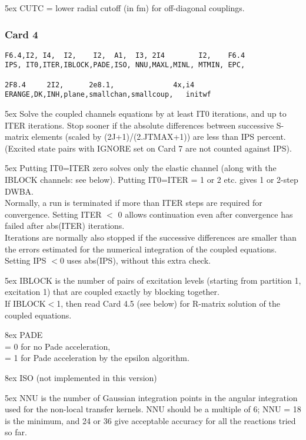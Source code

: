 \documentclass[11pt]{article}
\begin{document}
\hangindent 5ex
CUTC = lower radial cutoff (in fm) for off-diagonal couplings.
\newpage

\subsubsection*{Card 4}
\begin{verbatim}
F6.4,I2, I4,  I2,    I2,  A1,  I3, 2I4        I2,    F6.4
IPS, IT0,ITER,IBLOCK,PADE,ISO, NNU,MAXL,MINL, MTMIN, EPC,

2F8.4     2I2,      2e8.1,              4x,i4
ERANGE,DK,INH,plane,smallchan,smallcoup,   initwf
\end{verbatim}


\hangindent 5ex
Solve the coupled channels equations by at least IT0 iterations, and
up to ITER iterations.
Stop sooner if the absolute differences between successive S-matrix
elements (scaled by (2J+1)/(2.JTMAX+1)) are less than IPS percent.
(Excited state pairs with IGNORE set on Card 7
are not counted against IPS).

\hangindent 5ex
Putting IT0=ITER zero solves only the elastic channel (along with the
IBLOCK channels: see below).
Putting IT0=ITER = 1 or 2 etc. gives 1 or 2-step DWBA.
\\
Normally, a run is terminated if more than ITER steps are required for
convergence. Setting ITER $<$ 0 allows continuation even after
convergence has failed after abs(ITER) iterations.
\\
Iterations are normally also stopped if the successive differences are smaller
than the errors estimated for the numerical integration of the coupled
equations. Setting IPS $< 0$ uses abs(IPS), without this extra check.

\hangindent 5ex
IBLOCK is the number of pairs of excitation levels
(starting from partition 1, excitation 1) that are coupled exactly by
blocking together.\\
If IBLOCK$<$1, then read Card 4.5 (see below) for R-matrix solution of the
coupled equations.

\hangindent 8ex
PADE
\\ = 0 for no Pade acceleration,
\\ = 1 for Pade acceleration by the epsilon algorithm.



\hangindent 8ex
ISO (not implemented in this version)

\hangindent 5ex
NNU is the number of Gaussian integration points
in the angular
integration used for the non-local transfer kernels. NNU should
be a multiple of 6; NNU = 18 is the minimum, and 24 or 36 give
acceptable accuracy for all the reactions tried so far.
\end{document}
